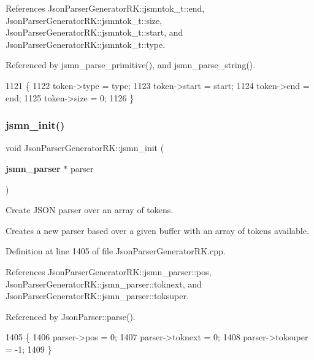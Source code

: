 References Json\+Parser\+Generator\+R\+K\+::jsmntok\+\_\+t\+::end, Json\+Parser\+Generator\+R\+K\+::jsmntok\+\_\+t\+::size, Json\+Parser\+Generator\+R\+K\+::jsmntok\+\_\+t\+::start, and Json\+Parser\+Generator\+R\+K\+::jsmntok\+\_\+t\+::type.



Referenced by jsmn\+\_\+parse\+\_\+primitive(), and jsmn\+\_\+parse\+\_\+string().


\begin{DoxyCode}
1121                                                 \{
1122     token->type = type;
1123     token->start = start;
1124     token->end = end;
1125     token->size = 0;
1126 \}
\end{DoxyCode}
\mbox{\label{namespace_json_parser_generator_r_k_adb1f5ae92d1df7b0b95f5caefbe0d55b}} 
\subsubsection{jsmn\+\_\+init()}
{\footnotesize\ttfamily void Json\+Parser\+Generator\+R\+K\+::jsmn\+\_\+init (\begin{DoxyParamCaption}\item[{\textbf{ jsmn\+\_\+parser} $\ast$}]{parser }\end{DoxyParamCaption})}



Create J\+S\+ON parser over an array of tokens. 

Creates a new parser based over a given buffer with an array of tokens available. 

Definition at line 1405 of file Json\+Parser\+Generator\+R\+K.\+cpp.



References Json\+Parser\+Generator\+R\+K\+::jsmn\+\_\+parser\+::pos, Json\+Parser\+Generator\+R\+K\+::jsmn\+\_\+parser\+::toknext, and Json\+Parser\+Generator\+R\+K\+::jsmn\+\_\+parser\+::toksuper.



Referenced by Json\+Parser\+::parse().


\begin{DoxyCode}
1405                                     \{
1406     parser->pos = 0;
1407     parser->toknext = 0;
1408     parser->toksuper = -1;
1409 \}
\end{DoxyCode}
\mbox{\label{namespace_json_parser_generator_r_k_acb71a39877526380a034824e99e59b75}} 
